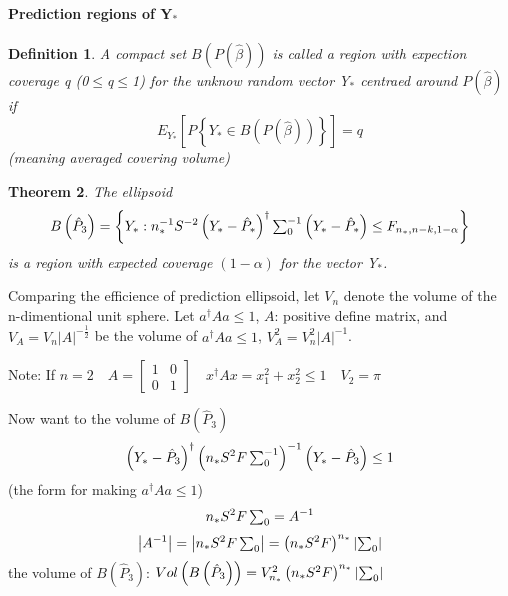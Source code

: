 \documentclass{article}
\newtheorem{theorem}{Theorem}
\newtheorem{definition}[theorem]{Definition}
\begin{document}
\bigskip

\paragraph{Prediction regions of Y$_{\ast }$}

\begin{definition}
A compact set $B\left( P\left( \hat{\beta}\right) \right) $ is called a
region with expection coverage q (0$\leq $q$\leq $1) for the unknow random
vector Y$_{\ast }$ centraed around $P\left( \hat{\beta}\right) $ if%
\begin{equation*}
E_{Y_{\ast }}\left[ P\left\{ Y_{\ast }\in B\left( P\left( \hat{\beta}\right)
\right) \right\} \right] =q
\end{equation*}%
(meaning averaged covering volume)
\end{definition}

\begin{theorem}
The ellipsoid 
\begin{equation*}
B\left( \hat{P}_{3}\right) =\left\{ Y_{\ast }:n_{\ast }^{-1}S^{-2}\left(
Y_{\ast }-\hat{P}_{\ast }\right) ^{\dagger }\tsum\nolimits_{0}^{-1}\left(
Y_{\ast }-\hat{P}_{\ast }\right) \leq F_{n_{\ast },n-k,1-\alpha }\right\}
\end{equation*}%
is a region with expected coverage $\left( 1-\alpha \right) $ for the vector
Y$_{\ast }$.
\end{theorem}

\bigskip

Comparing the efficience of prediction ellipsoid, let $V_{n}$ denote the
volume of the n-dimentional unit sphere. Let $a^{\dagger }Aa\leq 1$, $A$:
positive define matrix, and $V_{A}=V_{n}\left\vert A\right\vert ^{-\frac{1}{2%
}}$ be the volume of $a^{\dagger }Aa\leq 1$, $V_{A}^{2}=V_{n}^{2}\left\vert
A\right\vert ^{-1}$.

\bigskip

Note: If $n=2\quad A=\left[ 
\begin{array}{cc}
1 & 0 \\ 
0 & 1%
\end{array}%
\right] \quad x^{\dagger }Ax=x_{1}^{2}+x_{2}^{2}\leq 1\quad V_{2}=\pi $

Now want to the volume of $B\left( \hat{P}_{3}\right) $%
\begin{equation*}
\left( Y_{\ast }-\hat{P}_{3}\right) ^{\dagger }\left( n_{\ast
}S^{2}F\tsum\nolimits_{0}^{-1}\right) ^{-1}\left( Y_{\ast }-\hat{P}%
_{3}\right) \leq 1
\end{equation*}%
(the form for making $a^{\dagger }Aa\leq 1$)%
\begin{equation*}
 n_{\ast }S^{2}F\mathop{\textstyle \sum }\nolimits_{0}=A^{-1}
\end{equation*}%
\begin{equation*}
\left\vert A^{-1}\right\vert =\left\vert n_{\ast
}S^{2}F\mathop{\textstyle \sum }\nolimits_{0}\right\vert =\left( n_{\ast }S^{2}F\right)
^{n_{\ast }}\left\vert \mathop{\textstyle \sum }\nolimits_{0}\right\vert
\end{equation*}%
the volume of $B\left( \hat{P}_{3}\right) $: $Vol\left( B\left( \hat{P}%
_{3}\right) \right) =V_{n_{\ast }}^{2}\left( n_{\ast }S^{2}F\right)
^{n_{\ast }}\left\vert \tsum\nolimits_{0}\right\vert $
\end{document}
